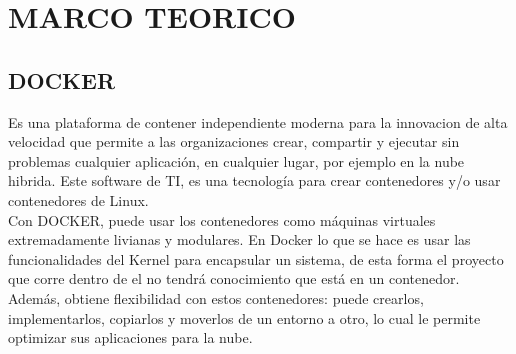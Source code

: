 \section{MARCO TEORICO} 

\subsection{DOCKER}
Es una plataforma de contener independiente moderna para la innovacion de alta velocidad que permite a las organizaciones crear, compartir y ejecutar sin problemas cualquier aplicación, en cualquier lugar, por ejemplo en la nube hibrida.
Este software de TI, es una tecnología para crear contenedores y/o usar contenedores de Linux.
\\Con DOCKER, puede usar los contenedores como máquinas virtuales extremadamente livianas y modulares. 
 En Docker lo que se hace es usar las funcionalidades del Kernel para encapsular un sistema, de esta forma el proyecto que corre dentro de el no tendrá conocimiento que está en un contenedor. Además, obtiene flexibilidad con estos contenedores: puede crearlos, implementarlos, copiarlos y moverlos de un entorno a otro, lo cual le permite optimizar sus aplicaciones para la nube.
